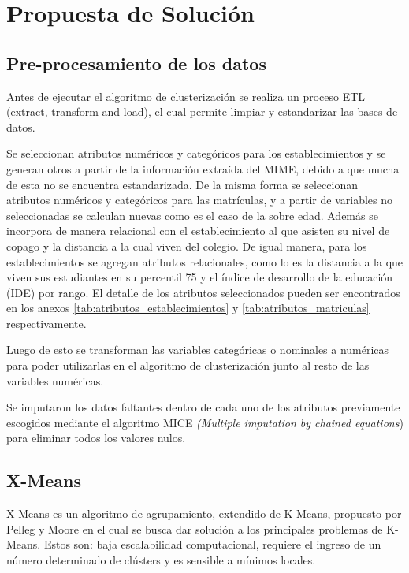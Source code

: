 \chapter{Propuesta de Solución}

\section{Pre-procesamiento de los datos}

Antes de ejecutar el algoritmo de clusterización se realiza un proceso ETL (extract, transform and load), el cual permite limpiar y estandarizar las bases de datos.

Se seleccionan atributos numéricos y categóricos para los establecimientos y se generan otros a partir de la información extraída del MIME\cite{MIME}, debido a que mucha de esta no se encuentra estandarizada. De la misma forma se seleccionan atributos numéricos y categóricos para las matrículas, y a partir de variables no seleccionadas se calculan nuevas como es el caso de la sobre edad. Además se incorpora de manera relacional con el establecimiento al que asisten su nivel de copago y la distancia a la cual viven del colegio. De igual manera, para los establecimientos se agregan atributos relacionales, como lo es la distancia a la que viven sus estudiantes en su percentil 75 y el índice de desarrollo de la educación (IDE) por rango. El detalle de los atributos seleccionados pueden ser encontrados en los anexos \ref{tab:atributos_establecimientos} y \ref{tab:atributos_matriculas} respectivamente.

Luego de esto se transforman las variables categóricas o nominales a numéricas para poder utilizarlas en el algoritmo de clusterización junto al resto de las variables numéricas.

Se imputaron los datos faltantes dentro de cada uno de los atributos previamente escogidos mediante el algoritmo MICE \textit{(Multiple imputation by chained equations}) para eliminar todos los valores nulos.

\section{X-Means}

X-Means es un algoritmo de agrupamiento, extendido de K-Means, propuesto por Pelleg y Moore \cite{Pelleg00x-means:extending} en el cual se busca dar solución a los principales problemas de K-Means. Estos son: baja escalabilidad computacional, requiere el ingreso de un número determinado de clústers y es sensible a mínimos locales.

